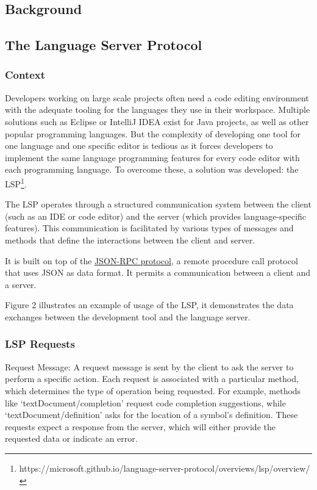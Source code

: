 \documentclass[10pt]{article}
\begin{document}
\begin{singlespace}
\section{Background}
\label{sec:background}
\subsection{The Language Server Protocol}
\subsubsection{Context}
Developers working on large scale projects often need a code editing environment with the adequate tooling for the languages they use in their workspace. Multiple solutions such as Eclipse or IntelliJ IDEA exist for Java projects, as well as other popular programming languages. But the complexity of developing one tool for one language and one specific editor is tedious as it forces developers to implement the same language programming features for every code editor with each programming language. To overcome these, a solution was developed: the LSP\footnote{https://microsoft.github.io/language-server-protocol/overviews/lsp/overview/}.

The LSP operates through a structured communication system between the client (such as an IDE or code editor) and the server (which provides language-specific features). This communication is facilitated by various types of messages and methods that define the interactions between the client and server.

It is built on top of the \href{https://www.jsonrpc.org/specification}{JSON-RPC protocol}, a remote procedure call protocol that uses JSON as data format.
It permits a communication between a client and a server.

Figure 2 illustrates an example of usage of the LSP, it demonstrates the data exchanges between the development tool and the language server.

\subsubsection{LSP Requests}

Request Message: A request message is sent by the client to ask the server to perform a specific action. Each request is associated with a particular method, which determines the type of operation being requested. For example, methods like `textDocument/completion' request code completion suggestions, while `textDocument/definition' asks for the location of a symbol's definition. These requests expect a response from the server, which will either provide the requested data or indicate an error.


\end{singlespace}
\end{document}
